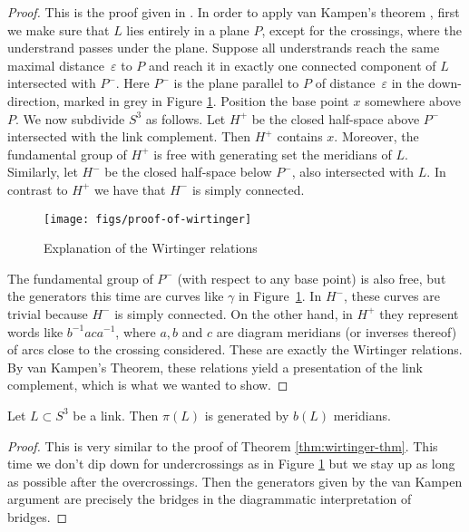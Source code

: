 \documentclass[main.tex]{subfiles}
\begin{document}
\begin{proof}
This is the proof given in \cite{rolfsen2003}. In order to apply van Kampen's theorem \cite{hatcher2002}, first we make sure that $L$ lies entirely in a plane $P$, except for the crossings, where the understrand passes under the plane. Suppose all understrands reach the same maximal distance~$\varepsilon$ to $P$ and reach it in exactly one connected component of $L$ intersected with $P^{-}$. Here $P^-$ is the plane parallel to $P$ of distance~$\varepsilon$ in the down-direction, marked in grey in Figure \ref{fig:proof-of-wirtinger}.
Position the base point $x$ somewhere above $P$. We now subdivide $S^3$ as follows.
Let $H^+$ be the closed half-space above $P^-$ intersected with the link complement. Then $H^+$ contains $x$. Moreover, the fundamental group of $H^+$ is free with generating set the meridians of $L$. Similarly, let $H^-$ be the closed half-space below $P^-$, also intersected with $L$. In contrast to $H^+$ we have that $H^-$ is simply connected.


\begin{figure}[htb]
\centering
\texttt{[image: figs/proof-of-wirtinger]}
\caption{Explanation of the Wirtinger relations}
\label{fig:proof-of-wirtinger}
\end{figure}


The fundamental group of $P^-$ (with respect to any base point) is also free, but the generators this time are curves like $\gamma$ in Figure~\ref{fig:proof-of-wirtinger}. In $H^-$, these curves are trivial because $H^-$ is simply connected. On the other hand, in $H^+$ they represent words like $b^{-1}aca^{-1}$, where $a, b$ and $c$ are diagram meridians (or inverses thereof) of arcs close to the crossing considered. These are exactly the Wirtinger relations.
By van Kampen's Theorem, these relations yield a presentation of the link complement, which is what we wanted to show.
\end{proof}

\begin{theorem}\label{thm:mr<=b}
Let $L \subset S^3$ be a link. Then $\pi(L)$ is generated by $b(L)$ meridians.
\end{theorem}

\begin{proof}
This is very similar to the proof of Theorem \ref{thm:wirtinger-thm}. This time we don't dip down for undercrossings as in Figure \ref{fig:proof-of-wirtinger} but we stay up as long as possible after the overcrossings. Then the generators given by the van Kampen argument are precisely the bridges in the diagrammatic interpretation of bridges.
\end{proof}
\end{document}
